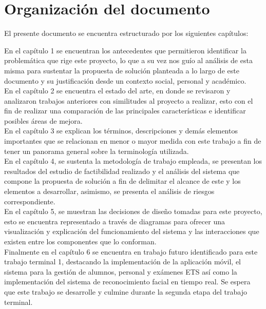 
\section{Organización del documento}

El presente documento se encuentra estructurado por los siguientes capítulos:

En el capítulo 1 se encuentran los antecedentes que permitieron identificar la problemática que rige este proyecto, lo que a su vez nos guío al análisis de esta misma para sustentar la propuesta de solución planteada a lo largo de este documento y su justificación desde un contexto social, personal y académico.\\
 
En el capítulo 2 se encuentra el estado del arte, en donde se revisaron y analizaron trabajos anteriores con similitudes al proyecto a realizar, esto con el fin de realizar una comparación de las principales características e identificar posibles áreas de mejora.\\

En el capítulo 3 se explican los términos, descripciones y demás elementos importantes que se relacionan en menor o mayor medida con este trabajo a fin de tener un panorama general sobre la terminología utilizada.\\

En el capítulo 4, se sustenta la metodología de trabajo empleada, se presentan los resultados del estudio de factibilidad realizado y el análisis del sistema que compone la propuesta de solución a fin de delimitar el alcance de este y los elementos a desarrollar, asimismo, se presenta el análisis de riesgos correspondiente.\\

En el capítulo 5, se muestran las decisiones de diseño tomadas para este proyecto, esto se encuentra representado a través de diagramas para ofrecer una visualización y explicación del funcionamiento del sistema y las interacciones que existen entre los componentes que lo conforman.\\


Finalmente en el capítulo 6 se encuentra en trabajo futuro identificado para este trabajo terminal 1, destacando la implementación de la aplicación móvil, el sistema para la gestión de alumnos, personal y exámenes ETS así como la implementación del sistema de reconocimiento facial en tiempo real. Se espera que este trabajo se desarrolle y culmine durante la segunda etapa del trabajo terminal.\\